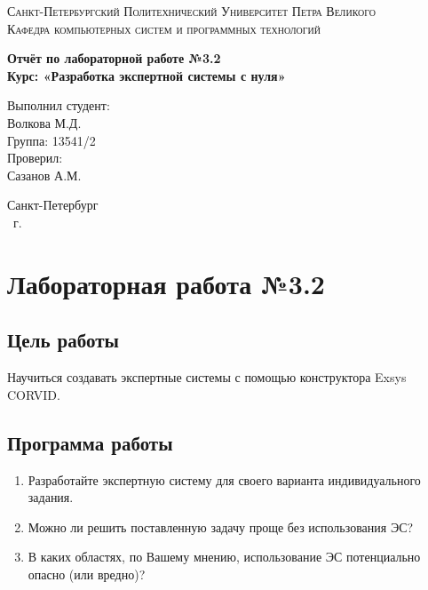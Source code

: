\documentclass[14pt,a4paper,report]{report}
\begin{document}
\def\contentsname{Содержание}

\begin{titlepage}
	\begin{center}
		\textsc{Санкт-Петербургский Политехнический 
			Университет Петра Великого\\[5mm]
			Кафедра компьютерных систем и программных технологий}
		
		\vfill
		
		\textbf{Отчёт по лабораторной работе №3.2\\[3mm]
			Курс: «Разработка экспертной системы с нуля»\\[41mm]
		}
	\end{center}
	
	\hfill
	\begin{minipage}{.4\textwidth}
		Выполнил студент:\\[2mm] 
		Волкова М.Д.\\
		Группа: 13541/2\\[5mm]
		
		Проверил:\\[2mm] 
		Сазанов А.М.
	\end{minipage}
	\vfill
	\begin{center}
		Санкт-Петербург\\ \the\year\ г.
	\end{center}
\end{titlepage}

\tableofcontents
\clearpage

\chapter{Лабораторная работа №3.2}

\section{Цель работы}

Научиться создавать экспертные системы с помощью конструктора Exsys CORVID.

\section{Программа работы}

\begin{enumerate}
	\item Разработайте экспертную систему для своего варианта индивидуального задания.
	\item Можно ли решить поставленную задачу проще без использования ЭС?
	\item В каких областях, по Вашему мнению, использование ЭС потенциально опасно (или вредно)?
\end{enumerate}
\end{document}
